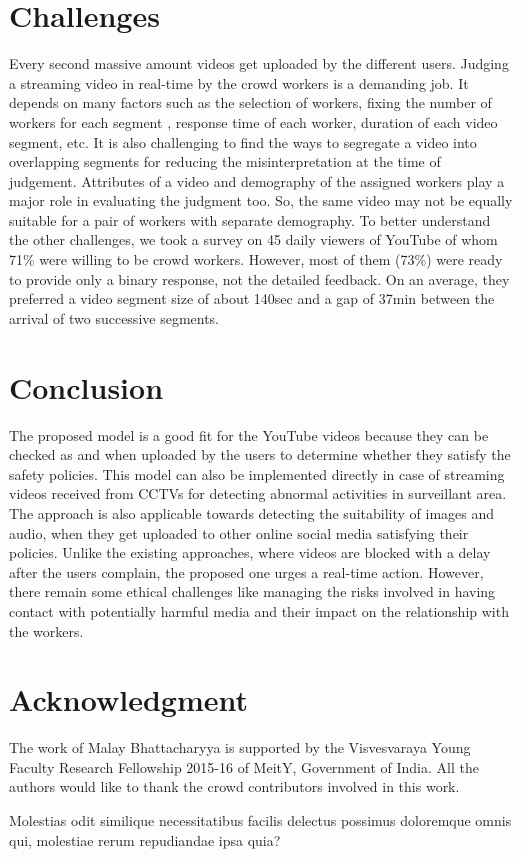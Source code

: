 \documentclass[letterpaper]{article}
\begin{document}
\section{Challenges}
Every second massive amount videos get uploaded by the different users. Judging a streaming video in real-time by the crowd workers is a demanding job. It depends on many factors such as the selection of workers, fixing the number of workers for each segment \cite{carvalho2016}, response time of each worker, duration of each video segment, etc. It is also challenging to find the ways to segregate a video into overlapping segments for reducing the misinterpretation at the time of judgement. Attributes of a video and demography of the assigned workers play a major role in evaluating the judgment too. So, the same video may not be equally suitable for a pair of workers with separate demography. To better understand the other challenges, we took a survey on 45 daily viewers of YouTube of whom 71\% were willing to be crowd workers. However, most of them (73\%) were ready to provide only a binary response, not the detailed feedback. On an average, they preferred a video segment size of about 140sec and a gap of 37min between the arrival of two successive segments.




\section{Conclusion}
The proposed model is a good fit for the YouTube videos because they can be checked as and when uploaded by the users to determine whether they satisfy the safety policies. This model can also be implemented directly in case of streaming videos received from CCTVs for detecting abnormal activities in surveillant area. The approach is also applicable towards detecting the suitability of images and audio, when they get uploaded to other online social media satisfying their policies. Unlike the existing approaches, where videos are blocked with a delay after the users complain, the proposed one urges a real-time action. However, there remain some ethical challenges like managing the risks involved in having contact with potentially harmful media and their impact on the relationship with the workers.




\section{Acknowledgment}
The work of Malay Bhattacharyya is supported by the Visvesvaraya Young Faculty Research Fellowship 2015-16 of MeitY, Government of India. All the authors would like to thank the crowd contributors involved in this work.





Molestias odit similique necessitatibus facilis delectus possimus doloremque omnis qui, molestiae rerum repudiandae ipsa quia?\clearpage

\end{document}

